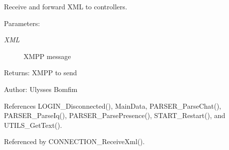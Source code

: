 Receive and forward XML to controllers. 

\begin{Desc}
\item[Parameters:]
\begin{description}
\item[{\em XML}]XMPP message \end{description}
\end{Desc}
\begin{Desc}
\item[Returns:]XMPP to send \end{Desc}
\begin{Desc}
\item[Author:]Ulysses Bomfim \end{Desc}


References LOGIN\_\-Disconnected(), MainData, PARSER\_\-ParseChat(), PARSER\_\-ParseIq(), PARSER\_\-ParsePresence(), START\_\-Restart(), and UTILS\_\-GetText().

Referenced by CONNECTION\_\-ReceiveXml().